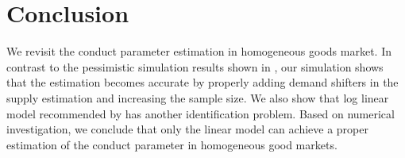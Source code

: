 \documentclass[11pt, a4paper]{article}
\begin{document}
    
\section{Conclusion}

We revisit the conduct parameter estimation in homogeneous goods market. In contrast to the pessimistic simulation results shown in \cite{perloff2012collinearity}, our simulation shows that the estimation becomes accurate by properly adding demand shifters in the supply estimation and increasing the sample size. We also show that log linear model recommended by \cite{perloff2012collinearity} has another identification problem. Based on numerical investigation, we conclude that only the linear model can achieve a proper estimation of the conduct parameter in homogeneous good markets. 




\end{document}
